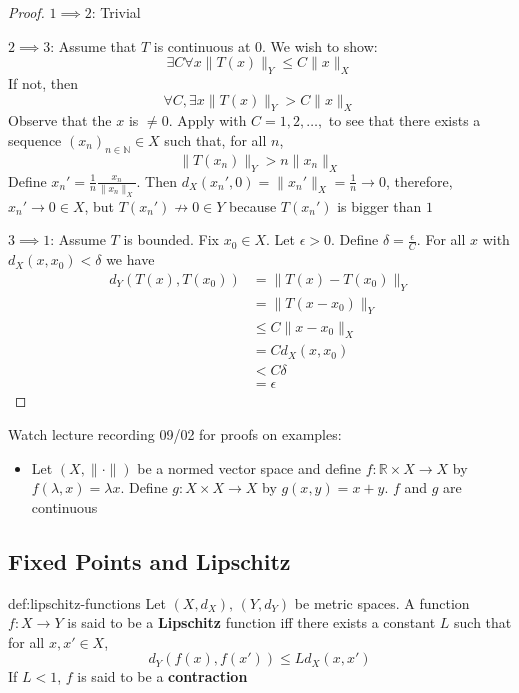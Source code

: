 \documentclass[landscape, 8pt]{extarticle}
\begin{document}
\begin{multicols}{3}
\begin{proof}
    $1 \implies 2$: Trivial

    $2 \implies 3$: Assume that $T$ is continuous at $0$. We wish to show:
    \[\exists C \forall x \lVert  T(x) \rVert_{Y} \le C \lVert x \rVert_{X}\]
    If not, then
    \[\forall C, \exists x \lVert  T(x) \rVert_{Y} > C \lVert x \rVert_{X}\]
    Observe that the $x$ is $\ne 0$. Apply with $C = 1,2,\dots,$ to see that there exists a sequence $(x_{n})_{n\in \mathbb{N}}\in X$ such that, for all $n$,
    \[\lVert T(x_{n}) \rVert_{Y} > n \lVert  x_{n} \rVert_{X}\]
    Define $x_{n}' = \frac{1}{n} \frac{x_{n}}{\lVert x_{n} \rVert_{X}}$. Then $d_{X}(x_{n}', 0) = \lVert x_{n}' \rVert_{X} = \frac{1}{n}\to 0$, therefore, $x_{n}' \to 0\in X$, but $T(x_{n}')\not\to 0 \in Y$ because $T(x_{n}')$ is bigger than $1$

    $3 \implies 1$: Assume $T$ is bounded. Fix $x_{0}\in X$. Let $\epsilon > 0$. Define $\delta = \frac{\epsilon}{C}$. For all $x$ with $d_{X}(x,x_{0}) < \delta$ we have
    \begin{align*}
        d_{Y}(T(x), T(x_{0})) &= \lVert T(x) - T(x_{0}) \rVert_{Y}\\
                              &= \lVert T(x - x_{0}) \rVert_{Y}\\
                              &\le C \lVert x - x_{0} \rVert_{X}\\
                              &= C d_{X}(x,x_{0})\\
                              &< C\delta\\
                              &= \epsilon
    \end{align*}
\end{proof}

Watch lecture recording 09/02 for proofs on examples:
\begin{itemize}
    \item Let $(X, \lVert  \cdot \rVert)$ be a normed vector space and define $f: \mathbb{R} \times X \to X $ by $f(\lambda, x) = \lambda x$. Define $g: X \times X \to X $ by $g(x,y) = x + y$. $f$ and $g$ are continuous
\end{itemize}


\subsection{Fixed Points and Lipschitz}

\begin{dfn}{def:lipschitz-functions}{}
    Let $(X, d_{X}),\,(Y, d_{Y})$ be metric spaces. A function $f : X \to Y$ is said to be a \textbf{Lipschitz} function iff there exists a constant $L$ such that for all $x,x'\in X$,
    \[d_{Y}(f(x), f(x')) \le L d_{X}(x,x')\]
    If $L < 1$, $f$ is said to be a \textbf{contraction}
\end{dfn}


\end{multicols}
\end{document}
